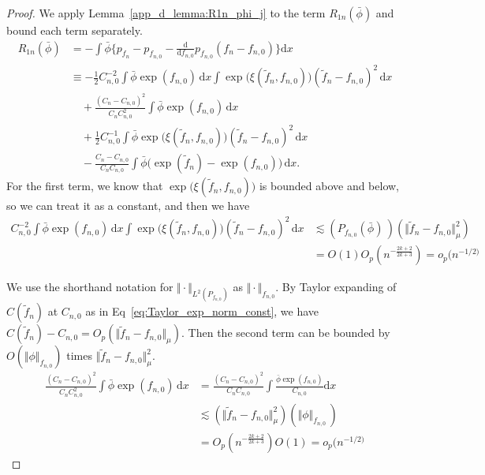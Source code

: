\begin{proof}
We apply Lemma~\ref{app_d_lemma:R1n_phi_j} to the term $R_{1n}(\bar\phi)$ and bound each term separately.
\begin{align*}
R_{1n}(\bar\phi)
  &= - \int \bar\phi \Biggl\{
        p_{f_n}-p_{f_{n,0}}
        - \frac{\mathrm{d}}{\mathrm{d}f_{n,0}}p_{f_{n,0}}(f_n-f_{n,0})
      \Biggr\} \mathrm{d}x \\[6pt]
  &\equiv -\tfrac{1}{2} C_{n,0}^{-2} \int \bar\phi \exp(f_{n,0})\, \mathrm{d}x 
            \int \exp\!\bigl(\xi(\tilde{f}_n,f_{n,0})\bigr)
             (\tilde{f}_n-f_{n,0})^2\, \mathrm{d}x \\[6pt]
  &\quad + \frac{(C_n-C_{n,0})^2}{C_n C_{n,0}^2}
            \int \bar\phi \exp(f_{n,0})\, \mathrm{d}x \\[6pt]
  &\quad + \tfrac{1}{2}C_{n,0}^{-1}\int \bar\phi 
             \exp\!\bigl(\xi(\tilde{f}_n,f_{n,0})\bigr)(\tilde{f}_n-f_{n,0})^2\, \mathrm{d}x \\[6pt]
  &\quad - \frac{C_n-C_{n,0}}{C_n C_{n,0}}
            \int \bar\phi \bigl(\exp(\tilde{f}_n)-\exp(f_{n,0})\bigr)\, \mathrm{d}x .
\end{align*}
For the first term, we know that $\exp\!\bigl(\xi(\tilde{f}_n,f_{n,0})\bigr)$ is bounded above and below, so we can treat it as a constant, and then we have
\begin{align*} 
C_{n,0}^{-2}\int \bar\phi \exp(f_{n,0})\, \mathrm{d}x \int \exp\!\bigl(\xi(\tilde{f}_n,f_{n,0})\bigr)(\tilde{f}_n-f_{n,0})^2\, \mathrm{d}x &\lesssim 
(P_{f_{n,0}}(\bar\phi) \,)(\Vert \tilde{f}_n - f_{n,0}\Vert_{\mu}^2)\\
&= O(1) O_p(n^{-\frac{2k+2}{2k+3}}) = o_p(n^{-1/2)}
\end{align*}

We use the shorthand notation for $\Vert \cdot \Vert_{L^2(P_{f_{n,0}})}$ as $\Vert \cdot \Vert_{f_{n,0}}$. By Taylor expanding of $C(\tilde f_n)$ at $C_{n,0}$ as in Eq~\ref{eq:Taylor_exp_norm_const}, we have $C(\tilde f_n) - C_{n,0} = O_p(\Vert\tilde{f}_n-f_{n,0}\Vert_{\mu})$. Then 
the second term can be bounded by $O(\Vert \phi\Vert_{f_{n,0}})$ times $\Vert \tilde{f}_n-f_{n,0}\Vert_{\mu}^2$.
\begin{align*}
\frac{(C_n-C_{n,0})^2}{C_n C_{n,0}^2}\int \bar\phi \exp(f_{n,0})\, \mathrm{d}x &= \frac{(C_n-C_{n,0})^2}{C_n C_{n,0}} \int \frac{\bar\phi \exp(f_{n,0})}{C_{n,0}} \mathrm{d}x \\
& \lesssim (\Vert \tilde{f}_n - f_{n,0}\Vert_{\mu}^2)(\Vert \phi\Vert_{f_{n,0}} \,)\\
&= O_p(n^{-\frac{2k+2}{2k+3}}) O(1) = o_p(n^{-1/2)}
\end{align*}


\end{proof}

